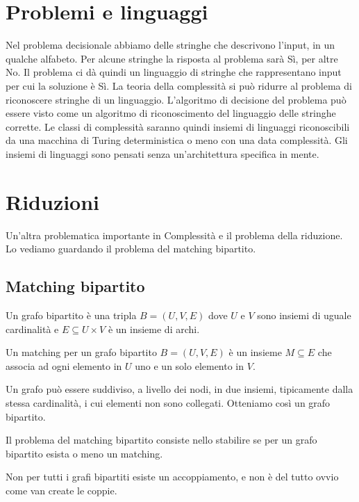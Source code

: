 \section{Problemi e linguaggi}

Nel problema decisionale abbiamo delle stringhe che descrivono l'input, in un qualche alfabeto.  Per
alcune stringhe la risposta al problema sarà Sì, per altre No. Il problema ci dà quindi un
linguaggio di stringhe che rappresentano input per cui la soluzione è Sì. La teoria della
complessità si può ridurre al problema di riconoscere stringhe di un linguaggio. L'algoritmo di
decisione del problema può essere visto come un algoritmo di riconoscimento del linguaggio delle
stringhe corrette. Le classi di complessità saranno quindi insiemi di linguaggi riconoscibili da
una macchina di Turing deterministica o meno con una data complessità.  Gli insiemi di linguaggi
sono pensati senza un'architettura specifica in mente.

\section{Riduzioni}

Un'altra problematica importante in Complessità e il problema della riduzione. Lo vediamo guardando
il problema del matching bipartito.

\subsection{Matching bipartito}

\begin{defn}
    Un grafo bipartito è una tripla $B = (U,V,E)$ dove $U$ e $V$ sono insiemi di uguale
    cardinalità e $E \subseteq U \times V$ è un insieme di archi.
\end{defn}

\begin{defn}
    Un matching per un grafo bipartito $B = (U,V,E)$ è un insieme $M \subseteq E$ che associa ad
    ogni elemento in $U$ uno e un solo elemento in $V$.
\end{defn}

Un grafo può essere suddiviso, a livello dei nodi, in due insiemi, tipicamente dalla stessa
cardinalità, i cui elementi non sono collegati. Otteniamo così un grafo bipartito.

Il problema del matching bipartito consiste nello stabilire se per un grafo bipartito esista o meno
un matching.

Non per tutti i grafi bipartiti esiste un accoppiamento, e non è del tutto ovvio come van create le
coppie.


